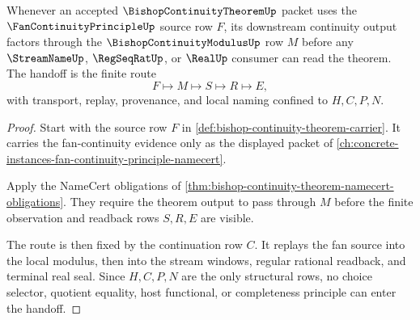 \begin{theorem}
\label{thm:bishop-continuity-theorem-fan-modulus-handoff}
Whenever an accepted $\BishopContinuityTheoremUp$ packet uses the $\FanContinuityPrincipleUp$ source row $F$, its downstream continuity output factors through the $\BishopContinuityModulusUp$ row $M$ before any $\StreamNameUp$, $\RegSeqRatUp$, or $\RealUp$ consumer can read the theorem. The handoff is the finite route
$$
F \longmapsto M \longmapsto S \longmapsto R \longmapsto E,
$$
with transport, replay, provenance, and local naming confined to $H,C,P,N$.
\end{theorem}
\begin{proof}
Start with the source row $F$ in \autoref{def:bishop-continuity-theorem-carrier}. It carries the fan-continuity evidence only as the displayed packet of \autoref{ch:concrete-instances-fan-continuity-principle-namecert}.

Apply the NameCert obligations of \autoref{thm:bishop-continuity-theorem-namecert-obligations}. They require the theorem output to pass through $M$ before the finite observation and readback rows $S,R,E$ are visible.

The route is then fixed by the continuation row $C$. It replays the fan source into the local modulus, then into the stream windows, regular rational readback, and terminal real seal. Since $H,C,P,N$ are the only structural rows, no choice selector, quotient equality, host functional, or completeness principle can enter the handoff.
\end{proof}

